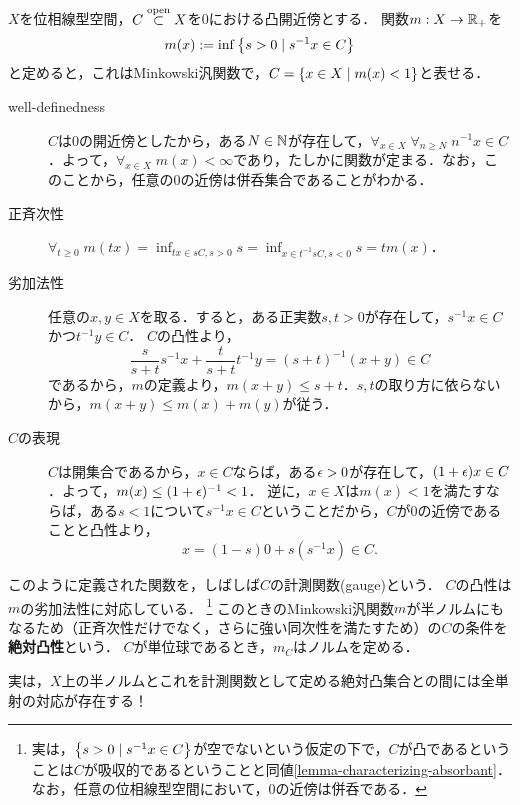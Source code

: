 \documentclass[uplatex,dvipdfmx]{jsreport}
\begin{document}
\begin{lemma}[gauge]
    $X$を位相線型空間，$C\overset{\mathrm{open}}{\subset} X$を$0$における凸開近傍とする．
    関数$m:X\to\mathbb{R}_+$を
    \[m(x):=\inf\left\{s>0\mid s^{-1}x\in C\right\}\]
    と定めると，これはMinkowski汎関数で，$C=\left\{x\in X\mid m(x)<1\right\}$と表せる．
\end{lemma}
\begin{Proof}\mbox{}
    \begin{description}
        \item[well-definedness] $C$は$0$の開近傍としたから，ある$N\in\mathbb{N}$が存在して，$\forall_{x\in X}\;\forall_{n\ge N}\;n^{-1}x\in C$．よって，$\forall_{x\in X}\;m(x)<\infty$であり，たしかに関数が定まる．なお，このことから，任意の$0$の近傍は併呑集合であることがわかる．
        \item[正斉次性] $\forall_{t\ge 0}\;m(tx)=\inf_{tx\in sC,s>0}s=\inf_{x\in t^{-1}sC,s<0}s=tm(x)$．
        \item[劣加法性] 任意の$x,y\in X$を取る．すると，ある正実数$s,t>0$が存在して，$s^{-1}x\in C$かつ$t^{-1}y\in C$．
        $C$の凸性より，
        \[\frac{s}{s+t}s^{-1}x+\frac{t}{s+t}t^{-1}y=(s+t)^{-1}(x+y)\in C\]
        であるから，$m$の定義より，$m(x+y)\le s+t$．$s,t$の取り方に依らないから，$m(x+y)\le m(x)+m(y)$が従う．
        \item[$C$の表現] $C$は開集合であるから，$x\in C$ならば，ある$\epsilon>0$が存在して，$(1+\epsilon)x\in C$．よって，$m(x)\le(1+\epsilon)^{-1}<1$．
        逆に，$x\in X$は$m(x)<1$を満たすならば，ある$s<1$について$s^{-1}x\in C$ということだから，$C$が$0$の近傍であることと凸性より，
        \[x=(1-s)0+s(s^{-1}x)\in C.\]
    \end{description}
\end{Proof}
\begin{remarks}\label{remarks-seminorm-and-absolutely-convex-sets}
    このように定義された関数を，しばしば$C$の計測関数(gauge)という．
    $C$の凸性は$m$の劣加法性に対応している．
    \footnote{実は，$\left\{s>0\mid s^{-1}x\in C\right\}$が空でないという仮定の下で，$C$が凸であるということは$C$が吸収的であるということと同値\ref{lemma-characterizing-absorbant}．なお，任意の位相線型空間において，$0$の近傍は併呑である．}
    このときのMinkowski汎関数$m$が半ノルムにもなるため（正斉次性だけでなく，さらに強い同次性を満たすため）の$C$の条件を\textbf{絶対凸性}という．
    $C$が単位球であるとき，$m_C$はノルムを定める．

    実は，$X$上の半ノルムとこれを計測関数として定める絶対凸集合との間には全単射の対応が存在する！
\end{remarks}
\end{document}
